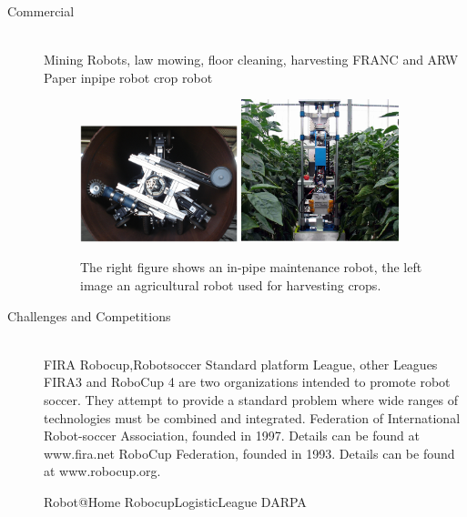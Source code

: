 \begin{description}
\item[Commercial]\hfill \\
Mining Robots, law mowing, floor cleaning, harvesting
FRANC and ARW Paper
inpipe robot \cite{mateos2013inpipe}
crop robot \cite{Schuetz2014}
\begin{figure}[thpb]
	  \myfloatalign
      \footnotesize
      \centering
    \subfloat
    {  \label{fig:fig_agv}
        \includegraphics[width=0.45\textwidth,height=0.2\textheight]{figures/fig_inpiperobot.png}
    }
    \subfloat
    {  \label{fig:fig_uav}
        \includegraphics[width=0.45\textwidth,height=0.2\textheight]{figures/fig_croprobot.png}
    }     
   \caption[Commercial robots]{The right figure shows an in-pipe maintenance robot, the left image an agricultural robot used for harvesting crops.}
   \label{fig:fig_rescue}
\end{figure}

\item[Challenges and Competitions]\hfill \\
FIRA
Robocup,Robotsoccer Standard platform League, other Leagues
FIRA3 and RoboCup 4 are two organizations intended to promote robot soccer. They
attempt to provide a standard problem where wide ranges of technologies must be combined
and integrated.
Federation of International Robot-soccer Association, founded in 1997. Details can be found at www.fira.net
RoboCup Federation, founded in 1993. Details can be found at www.robocup.org.

Robot@Home
RobocupLogisticLeague
DARPA

\end{description}

